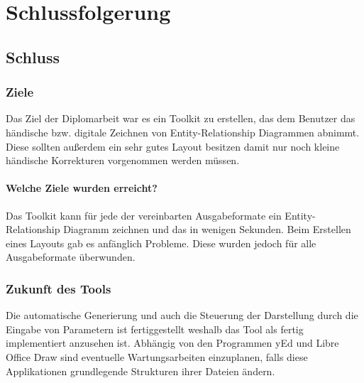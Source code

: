 \part{Schlussfolgerung}

\chapter{Schluss}
\prc

\section{Ziele}

Das Ziel der Diplomarbeit war es ein Toolkit zu erstellen, das dem Benutzer das händische bzw. digitale Zeichnen von Entity-Relationship Diagrammen abnimmt. Diese sollten außerdem ein sehr gutes Layout besitzen damit nur noch kleine händische Korrekturen vorgenommen werden müssen.

\subsection{Welche Ziele wurden erreicht?}

Das Toolkit kann für jede der vereinbarten Ausgabeformate ein Entity-Relationship Diagramm zeichnen und das in wenigen Sekunden. Beim Erstellen eines Layouts gab es anfänglich Probleme. Diese wurden jedoch für alle Ausgabeformate überwunden.

\section{Zukunft des Tools}

Die automatische Generierung und auch die Steuerung der Darstellung durch die Eingabe von Parametern ist fertiggestellt weshalb das Tool als fertig implementiert anzusehen ist. Abhängig von den Programmen yEd und Libre Office Draw sind eventuelle Wartungsarbeiten einzuplanen, falls diese Applikationen grundlegende Strukturen ihrer Dateien ändern.

\newpage
